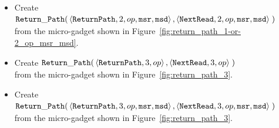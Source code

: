 \begin{itemize}
    \item Create
    $\begin{aligned}[t]
        {\tt Return\_Path}(& \left\langle {\tt ReturnPath},    2, op, {\tt msr}, {\tt msd} \right\rangle,
                           \left\langle {\tt NextRead}, 2, op, {\tt msr}, {\tt msd} \right\rangle \;)
    \end{aligned}$\\from the micro-gadget shown in Figure~\ref{fig:return_path_1-or-2_op_msr_msd}.



    \item Create
    $\begin{aligned}[t]
        {\tt Return\_Path}(& \left\langle {\tt ReturnPath},    3, op \right\rangle,
                           \left\langle {\tt NextRead}, 3, op \right\rangle \;)
    \end{aligned}$\\from the micro-gadget shown in Figure~\ref{fig:return_path_3}.


    \item Create
    $\begin{aligned}[t]
        {\tt Return\_Path}(& \left\langle {\tt ReturnPath},    3, op, {\tt msr}, {\tt msd} \right\rangle,
                           \left\langle {\tt NextRead}, 3, op, {\tt msr}, {\tt msd} \right\rangle \;)
    \end{aligned}$\\from the micro-gadget shown in Figure~\ref{fig:return_path_3}.

\end{itemize}

